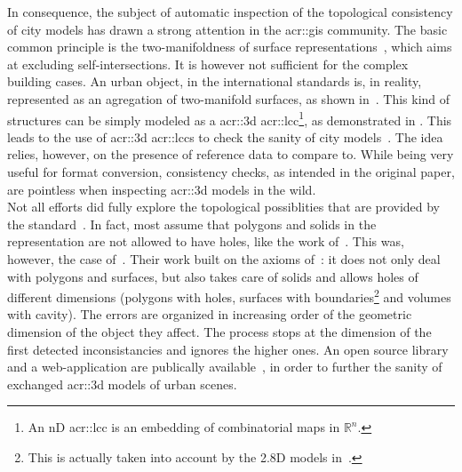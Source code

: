         In consequence, the subject of automatic inspection of the topological consistency of city models has drawn a strong attention in the \gls{acr::gis} community.
        The basic common principle is the two-manifoldness of surface representations~\parencite{groger2011achieve}, which aims at excluding self-intersections.
        It is however not sufficient for the complex building cases.
        An urban object, in the international standards is, in reality, represented as an agregation of two-manifold surfaces, as shown in~\textcite{groger2011achieve, ledoux2013validation}.
        This kind of structures can be simply modeled as a \gls{acr::3d} \gls{acr::lcc}\parencite{damiand2014combinatorial}\footnote{
            An nD \gls{acr::lcc} is an embedding of combinatorial maps in \(\mathbb{R}^n\).
        }, as demonstrated in \textcite{diakite2014topological}.
        This leads to the use of \gls{acr::3d} \glspl{acr::lcc} to check the sanity of city models~\parencite{gorszczyk2016automatic}.
        The idea relies, however, on the presence of reference data to compare to.
        While being very useful for format conversion, consistency checks, as intended in the original paper, are pointless when inspecting \gls{acr::3d} models in the wild.\\
        Not all efforts did fully explore the topological possiblities that are provided by the standard~\parencite{biljecki2016most, ledoux2013validation}.
        In fact, most assume that polygons and solids in the representation are not allowed to have holes, like the work of~\textcite{groger2011achieve, alam2014towards}.
        This was, however, the case of~\textcite{ledoux2013validation}.
        Their work built on the axioms of~\textcite{groger2011achieve}: it does not only deal with polygons and surfaces, but also takes care of solids and allows holes of different dimensions (polygons with holes, surfaces with boundaries\footnote{
            This is actually taken into account by the 2.8D models in~\textcite{groger2011achieve}.
        } and volumes with cavity).
        The errors are organized in increasing order of the geometric dimension of the object they affect.
        The process stops at the dimension of the first detected inconsistancies and ignores the higher ones. 
        An open source library and a web-application are publically available~\parencite{ledoux2018val3dity}, in order to further the sanity of exchanged \gls{acr::3d} models of urban scenes.\\

